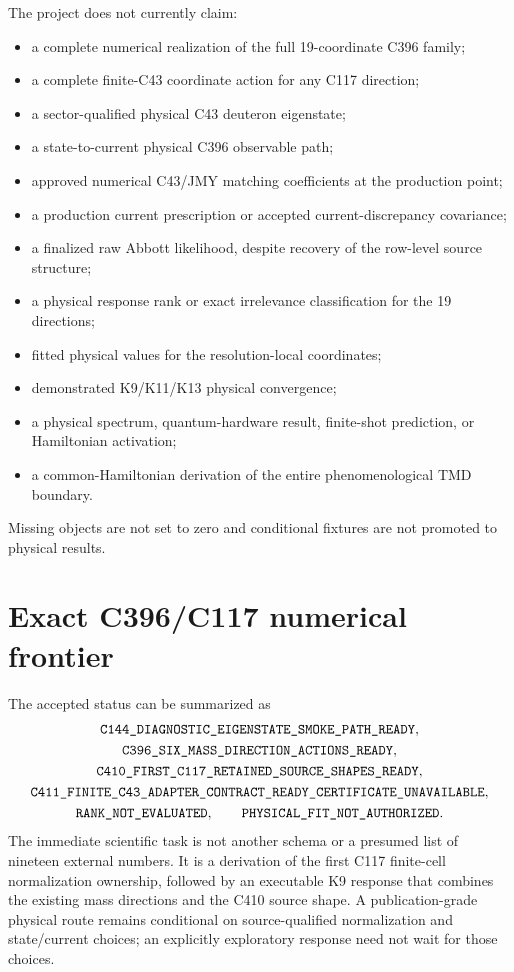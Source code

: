 \documentclass[11pt,oneside]{book}
\newcommand{\statuscode}[1]{\text{\ttfamily\detokenize{#1}}}
\begin{document}
The project does not currently claim:
\begin{itemize}
 \item a complete numerical realization of the full 19-coordinate C396 family;
 \item a complete finite-C43 coordinate action for any C117 direction;
 \item a sector-qualified physical C43 deuteron eigenstate;
 \item a state-to-current physical C396 observable path;
 \item approved numerical C43/JMY matching coefficients at the production point;
 \item a production current prescription or accepted current-discrepancy covariance;
 \item a finalized raw Abbott likelihood, despite recovery of the row-level source structure;
 \item a physical response rank or exact irrelevance classification for the 19 directions;
 \item fitted physical values for the resolution-local coordinates;
 \item demonstrated K9/K11/K13 physical convergence;
 \item a physical spectrum, quantum-hardware result, finite-shot prediction, or Hamiltonian activation;
 \item a common-Hamiltonian derivation of the entire phenomenological TMD boundary.
\end{itemize}
Missing objects are not set to zero and conditional fixtures are not promoted to physical results.

\section{Exact C396/C117 numerical frontier}

The accepted status can be summarized as
\begin{equation}
 \begin{gathered}
 \statuscode{C144_DIAGNOSTIC_EIGENSTATE_SMOKE_PATH_READY},\\
 \statuscode{C396_SIX_MASS_DIRECTION_ACTIONS_READY},\\
 \statuscode{C410_FIRST_C117_RETAINED_SOURCE_SHAPES_READY},\\
 \statuscode{C411_FINITE_C43_ADAPTER_CONTRACT_READY_CERTIFICATE_UNAVAILABLE},\\
 \statuscode{RANK_NOT_EVALUATED},\qquad
 \statuscode{PHYSICAL_FIT_NOT_AUTHORIZED}.
 \end{gathered}
 \label{eq:accepted-c411-status}
\end{equation}
The immediate scientific task is not another schema or a presumed list of nineteen external numbers.  It is a derivation of the first C117 finite-cell normalization ownership, followed by an executable K9 response that combines the existing mass directions and the C410 source shape.  A publication-grade physical route remains conditional on source-qualified normalization and state/current choices; an explicitly exploratory response need not wait for those choices.
\end{document}
